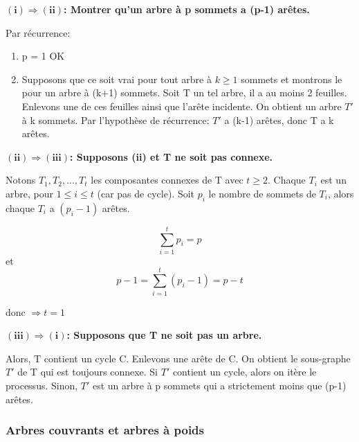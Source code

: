 \begin{demo}

$\mathbf{(i) \Rightarrow (ii)}$\textbf{: Montrer qu'un arbre à p sommets a (p-1) arêtes.}

	Par récurrence:
		\begin{enumerate}
			\item p = 1 OK 
			\item Supposons que ce soit vrai pour tout arbre à $ k \geq 1$ sommets et montrons le pour un arbre à (k+1) sommets. Soit T un tel arbre, il a au moins 2 feuilles. Enlevons une de ces feuilles ainsi que l'arête incidente. On obtient un arbre ${T}'$ à k sommets. Par l’hypothèse de récurrence: ${T}'$ a (k-1) arêtes, donc T a k arêtes.
		\end{enumerate} 

\hspace{-0.5cm}$\mathbf{(ii) \Rightarrow (iii)}$\textbf{: Supposons (ii) et T ne soit pas connexe.}

	Notons $T_{1}, T_{2},...,T_{t}$ les composantes connexes de T avec $t \geq 2$. Chaque $T_{i}$ est un arbre, pour $1 \leq i \leq t$ (car pas de cycle). Soit $p_{i}$ le nombre de sommets de $T_{i}$, alors chaque $T_{i}$ a $(p_{i}-1)$ arêtes.\\

	\begin{minipage}{.5\textwidth}
		$$\sum_{i=1}^{t} p_{i} = p$$ et $$p-1 = \sum_{i=1}^{t} (p_{i}-1) = p - t $$ 
	\end{minipage}
	\begin{minipage}{.5\textwidth}
		donc $\Rightarrow t = 1 $
	\end{minipage}

\hspace{-0.5cm}$\mathbf{(iii) \Rightarrow (i)}$\textbf{: Supposons que T ne soit pas un arbre.}

	Alors, T contient un cycle C. Enlevons une arête de C. On obtient le sous-graphe ${T}'$ de T qui est toujours connexe. Si ${T}'$ contient un cycle, alors on itère le processus. Sinon, ${T}'$ est un arbre à p sommets qui a strictement moins que (p-1) arêtes.
		
\end{demo}


\subsubsection{Arbres couvrants et arbres à poids}

